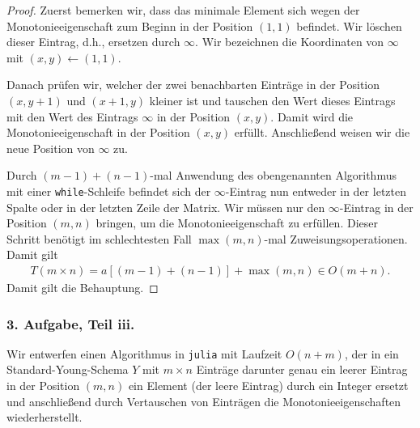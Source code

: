 \documentclass[draft,a5paper]{article}
\begin{document}
\begin{proof}
  Zuerst bemerken wir, dass das minimale Element sich wegen der
  Monotonieeigenschaft zum Beginn in der Position \((1, 1)\) befindet.
  Wir löschen dieser Eintrag, d.h., ersetzen durch \(\infty\).  Wir
  bezeichnen die Koordinaten von \(\infty\) mit \((x, y) \leftarrow (1, 1)\).

  Danach prüfen wir, welcher der zwei benachbarten Einträge in der
  Position \((x, y + 1)\) und \((x + 1, y)\) kleiner ist und tauschen
  den Wert dieses Eintrags mit den Wert des Eintrags \(\infty\) in der
  Position \((x, y)\).  Damit wird die Monotonieeigenschaft in der
  Position \((x, y)\) erfüllt.  Anschließend weisen wir die neue
  Position von \(\infty\) zu.

  Durch \((m - 1) + (n - 1)\)-mal Anwendung des obengenannten
  Algorithmus mit einer \texttt{while}-Schleife befindet sich der
  \(\infty\)-Eintrag nun entweder in der letzten Spalte oder in der letzten
  Zeile der Matrix.  Wir müssen nur den \(\infty\)-Eintrag in der Position
  \((m, n)\) bringen, um die Monotonieeigenschaft zu erfüllen.
  Dieser Schritt benötigt im schlechtesten Fall \(\max(m, n)\)-mal
  Zuweisungsoperationen.  Damit gilt
  \begin{align*}
    T(m \times n) = a[(m - 1) + (n - 1)] + \max(m, n) \in O(m + n).
  \end{align*}
  Damit gilt die Behauptung.
\end{proof}

\subsubsection*{3. Aufgabe, Teil iii.}

Wir entwerfen einen Algorithmus in \texttt{julia} mit Laufzeit
\(O(n + m)\), der in ein Standard-Young-Schema \(Y\) mit
\(m \times n\) Einträge \textemdash{} darunter genau ein leerer Eintrag in
der Position \((m, n)\) \textemdash{} ein Element (der leere Eintrag)
durch ein Integer ersetzt und anschließend durch Vertauschen von
Einträgen die Monotonieeigenschaften wiederherstellt.
\end{document}
